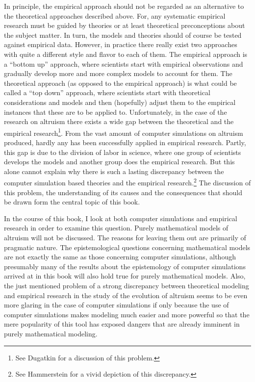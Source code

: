 In principle, the empirical approach should not be regarded as an
alternative to the theoretical approaches described above.  For, any
systematic empirical research must be guided by theories or at least
theoretical preconceptions about the subject matter. In turn, the models and
theories should of course be tested against empirical data.  However, in
practice there really exist two approaches with quite a different style and
flavor to each of them.  The empirical approach is a ``bottom up'' approach,
where scientists start with empirical observations and gradually develop more
and more complex models to account for them.  The theoretical approach (as
opposed to the empirical approach) is what could be called a ``top down''
approach, where scientists start with theoretical considerations and models
and then (hopefully) adjust them to the empirical instances that these are to
be applied to.  Unfortunately, in the case of the research on altruism there
exists a wide gap between the theoretical and the empirical
research\footnote{See Dugatkin \cite[]{dugatkin:1998} for a discussion of this
  problem.}. From the vast amount of computer simulations on altruism
produced, hardly any has been successfully applied in empirical research. 
Partly, this gap is due to the division of labor in science, where one group
of scientists develops the models and another group does the empirical
research. But this alone cannot explain why there is such a lasting
discrepancy between the computer simulation based theories and the empirical
research.\footnote{See Hammerstein \cite[]{hammerstein:2003} for a vivid
depiction of this discrepancy.} The discussion of this problem, the understanding of its causes and the consequences that should be drawn form the central topic of this book.

In the course of this book, I look at both computer simulations
and empirical research in order to examine this question. Purely
mathematical models of altruism will not be discussed. The reasons for
leaving them out are primarily of pragmatic nature. The
epistemological questions concerning mathematical models are not exactly the
same as those concerning computer simulations, although presumably many of the
results about the epistemology of computer simulations arrived at in this
book will also hold true for purely mathematical models. Also, the just
mentioned problem of a strong discrepancy between theoretical
modeling and empirical research in the study of the evolution of
altruism seems to be even more glaring in the case of computer
simulations if only because the use of computer simulations makes
modeling much easier and more powerful so that the mere popularity of
this tool has exposed dangers that are already imminent in
purely mathematical modeling.

